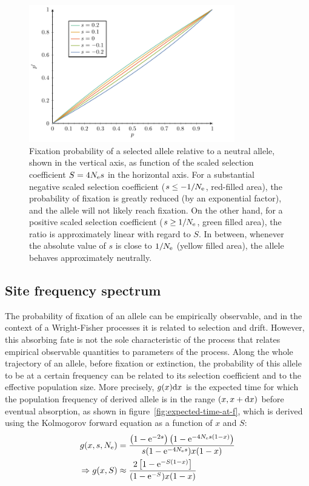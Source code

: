 \begin{figure}[H]
    \centering
    \includegraphics[width=0.8\textwidth, page=2] {figures.pdf}
    \caption[Relative fixation probability]{
    Fixation probability of a selected allele relative to a neutral allele, shown in the vertical axis, as function of the scaled selection coefficient $S=4 N_{\text{e}} s$ in the horizontal axis.
    For a substantial negative scaled selection coefficient ($s \leq -1/N_{\text{e}}$, red-filled area), the probability of fixation is greatly reduced (by an exponential factor), and the allele will not likely reach fixation.
    On the other hand, for a positive scaled selection coefficient ($s \geq 1 / N_{\text{e}}$, green filled area), the ratio is approximately linear with regard to $S$.
    In between, whenever the absolute value of $s$ is close to $1 / N_{\text{e}}$ (yellow filled area), the allele behaves approximately neutrally.}
    \label{fig:relative-fixation-probability}
\end{figure}

\subsection{Site frequency spectrum}
The probability of fixation of an allele can be empirically observable, and in the context of a Wright-Fisher processes it is related to selection and drift.
However, this absorbing fate is not the sole characteristic of the process that relates empirical observable quantities to parameters of the process.
Along the whole trajectory of an allele, before fixation or extinction, the probability of this allele to be at a certain frequency can be related to its selection coefficient and to the effective population size.
More precisely, $g(x) \mathrm{d} x $ is the expected time for which the population frequency of derived allele is in the range $(x, x+\mathrm{d} x)$ before eventual absorption, as shown in figure~\ref{fig:expected-time-at-f}, which is derived using the Kolmogorov forward equation as a function of $x$ and $S$:
\begin{align}
    g(x, s, N_{\text{e}}) & = \dfrac{\left( 1 - \text{e}^{- 2 s }\right) \left( 1 - \text{e}^{-4 N_{\text{e}} s(1-x)}\right)}{ s (1 - \text{e}^{-4 N_{\text{e}} s})x(1-x)} \\
    \Rightarrow g(x, S) & \approx \dfrac{2 \left[ 1 - \text{e}^{-S(1-x)}\right]}{(1 - \text{e}^{-S})x(1-x)} \label{eq:expected_time}
\end{align}

